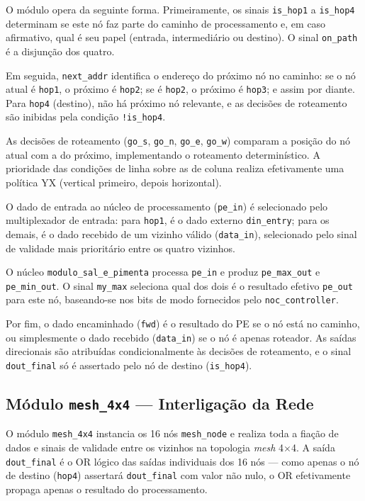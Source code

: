 \documentclass[12pt, a4paper]{article}
\begin{document}
	O módulo opera da seguinte forma. Primeiramente, os sinais \texttt{is\_hop1}
	a \texttt{is\_hop4} determinam se este nó faz parte do caminho de
	processamento e, em caso afirmativo, qual é seu papel (entrada, intermediário
	ou destino). O sinal \texttt{on\_path} é a disjunção dos quatro.
	
	Em seguida, \texttt{next\_addr} identifica o endereço do próximo nó no
	caminho: se o nó atual é \texttt{hop1}, o próximo é \texttt{hop2}; se é
	\texttt{hop2}, o próximo é \texttt{hop3}; e assim por diante. Para
	\texttt{hop4} (destino), não há próximo nó relevante, e as decisões de
	roteamento são inibidas pela condição \texttt{!is\_hop4}.
	
	As decisões de roteamento (\texttt{go\_s}, \texttt{go\_n}, \texttt{go\_e},
	\texttt{go\_w}) comparam a posição do nó atual com a do próximo, implementando
	o roteamento determinístico. A prioridade das condições de linha sobre as de
	coluna realiza efetivamente uma política YX (vertical primeiro, depois
	horizontal).
	
	O dado de entrada ao núcleo de processamento (\texttt{pe\_in}) é selecionado
	pelo multiplexador de entrada: para \texttt{hop1}, é o dado externo
	\texttt{din\_entry}; para os demais, é o dado recebido de um vizinho válido
	(\texttt{data\_in}), selecionado pelo sinal de validade mais prioritário entre
	os quatro vizinhos.
	
	O núcleo \texttt{modulo\_sal\_e\_pimenta} processa \texttt{pe\_in} e produz
	\texttt{pe\_max\_out} e \texttt{pe\_min\_out}. O sinal \texttt{my\_max}
	seleciona qual dos dois é o resultado efetivo \texttt{pe\_out} para este nó,
	baseando-se nos bits de modo fornecidos pelo \texttt{noc\_controller}.
	
	Por fim, o dado encaminhado (\texttt{fwd}) é o resultado do PE se o nó está
	no caminho, ou simplesmente o dado recebido (\texttt{data\_in}) se o nó é
	apenas roteador. As saídas direcionais são atribuídas condicionalmente às
	decisões de roteamento, e o sinal \texttt{dout\_final} só é assertado pelo
	nó de destino (\texttt{is\_hop4}).
	
	\subsection{Módulo \texttt{mesh\_4x4} --- Interligação da Rede}
	
	O módulo \texttt{mesh\_4x4} instancia os 16 nós \texttt{mesh\_node} e realiza
	toda a fiação de dados e sinais de validade entre os vizinhos na topologia
	\textit{mesh} 4$\times$4. A saída \texttt{dout\_final} é o OR lógico das
	saídas individuais dos 16 nós --- como apenas o nó de destino (\texttt{hop4})
	assertará \texttt{dout\_final} com valor não nulo, o OR efetivamente propaga
	apenas o resultado do processamento.
	
\end{document}
